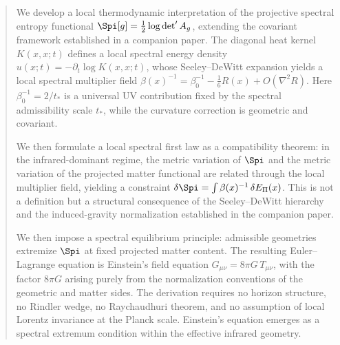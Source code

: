 \begin{abstract}
  We develop a local thermodynamic interpretation of the projective spectral entropy
  functional $\Spi[g] = \frac{1}{2}\log\det' A_g$, extending the covariant framework
  established in a companion paper.
  The diagonal heat kernel $K(x,x;t)$ defines a local spectral energy density
  $u(x;t) = -\partial_t \log K(x,x;t)$, whose Seeley--DeWitt expansion yields
  a local spectral multiplier field $\beta(x)^{-1} = \beta_0^{-1} - \frac{1}{6}R(x) + O(\nabla^2 R)$.
  Here $\beta_0^{-1} = 2/t_*$ is a universal UV contribution fixed by the spectral
  admissibility scale $t_*$, while the curvature correction is geometric and covariant.

  We then formulate a local spectral first law as a compatibility theorem:
  in the infrared-dominant regime, the metric variation of $\Spi$ and the metric
  variation of the projected matter functional are related through the local multiplier
  field, yielding a constraint $\delta\Spi = \int \beta(x)^{-1}\,\delta E_\Pi(x)$.
  This is not a definition but a structural consequence of the Seeley--DeWitt
  hierarchy and the induced-gravity normalization established in the companion paper.

  We then impose a spectral equilibrium principle: admissible geometries extremize
  $\Spi$ at fixed projected matter content.
  The resulting Euler--Lagrange equation is Einstein's field equation
  $G_{\mu\nu} = 8\pi G\, T_{\mu\nu}$, with the factor $8\pi G$ arising purely from
  the normalization conventions of the geometric and matter sides.
  The derivation requires no horizon structure, no Rindler wedge, no Raychaudhuri
  theorem, and no assumption of local Lorentz invariance at the Planck scale.
  Einstein's equation emerges as a spectral extremum condition within the
  effective infrared geometry.
\end{abstract}
